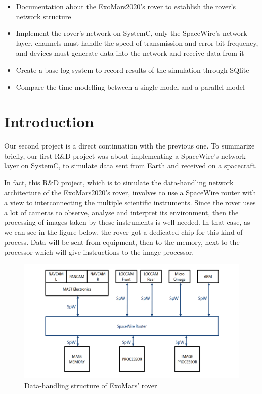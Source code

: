 \documentclass[12pt,a4paper]{article}
\begin{document}
\begin{itemize}
    \item Documentation about the ExoMars2020's rover to establish the rover's network structure
    \item Implement the rover's network on SystemC, only the SpaceWire's network layer, channels must handle the speed of transmission and error bit frequency, and devices must generate data into the network and receive data from it
    \item Create a base log-system to record results of the simulation through SQlite
    \item Compare the time modelling between a single model and a parallel model
\end{itemize}

\section{Introduction}

Our second project is a direct continuation with the previous one. To summarize briefly, our first R\&D project was about implementing a SpaceWire's network layer on SystemC, to simulate data sent from Earth and received on a spacecraft.\smallbreak

In fact, this R\&D project, which is to simulate the data-handling network architecture of the ExoMars2020's rover, involves to use a SpaceWire router with a view to interconnecting the multiple scientific instruments. Since the rover uses a lot of cameras to observe, analyse and interpret its environment, then the processing of images taken by these instruments is well needed. In that case, as we can see in the figure below, the rover got a dedicated chip for this kind of process. Data will be sent from equipment, then to the memory, next to the processor which will give instructions to the image processor.\smallbreak

\begin{figure}[hb]
	\centering
    \includegraphics[scale = 0.5]{pictures/data_network_architecture.png}
    \caption{Data-handling structure of ExoMars' rover}
\end{figure}
\end{document}
